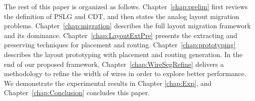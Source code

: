   The rest of this paper is organized as follows. 
  Chapter~\ref{chap:prelim} first reviews the definition of PSLG and CDT, and then states the analog layout migration problems. 
  Chapter~\ref{chap:migration} describes the full layout migration framework and its dominance.
  Chapter~\ref{chap:LayoutExtPre} presents the extracting and preserving techniques for placement and routing. 
  Chapter~\ref{chap:prototyping} describes the layout prototyping with placement and routing generation. In the end of our proposed framework, Chapter~\ref{chap:WireSegRefine} delivers a methodology to refine the width of wires in order to explore better performance. 
  We demonstrate the experimental results in Chapter \ref{chap:Exp}, and Chapter~\ref{chap:Conclusion} concludes this paper. 
